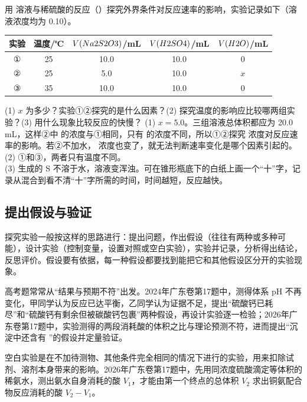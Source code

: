 \begin{liti}[基础·控制变量]
用  溶液与稀硫酸的反应（）探究外界条件对反应速率的影响，实验记录如下（溶液浓度均为 0.10\molL）。

\begin{center}
\small
\begin{tabular}{ccccc}
\toprule
实验 & 温度/℃ & $V(Na2S2O3)$/mL & $V(H2SO4)$/mL & $V(H2O)$/mL \\
\midrule
① & 25 & 10.0 & 10.0 & 0 \\
② & 25 & 5.0 & 10.0 & $x$ \\
③ & 35 & 10.0 & 10.0 & 0 \\
\bottomrule
\end{tabular}
\end{center}
(1) $x$ 为多少？实验①②探究的是什么因素？(2) 探究温度的影响应比较哪两组实验？(3) 用什么现象比较反应的快慢？
\tcblower
\jie (1) $x=5.0$。三组溶液总体积都应为 20.0 mL，这样②中  的浓度与①相同，只有  的浓度不同，所以①②探究  浓度对反应速率的影响。若②不加水， 浓度也变了，就无法判断速率变化是哪个因素引起的。\\
(2) ①和③，两者只有温度不同。\\
(3) 生成的 S 不溶于水，溶液变浑浊。可在锥形瓶底下的白纸上画一个“十”字，记录从混合到看不清“十”字所需的时间，时间越短，反应越快。
\end{liti}

\subsection{提出假设与验证}

探究实验一般按这样的思路进行：提出问题，作出假设（往往有两种或多种可能），设计实验（控制变量，设置对照或空白实验），实验并记录，分析得出结论，反思评价。假设要有依据，每一种假设都要找到能把它和其他假设区分开的实验现象。

高考题常常从“结果与预期不符”出发。2024年广东卷第17题中，测得体系 pH 不再变化，甲同学认为反应已达平衡，乙同学认为证据不足，提出“硫酸钙已耗尽”和“硫酸钙有剩余但被碳酸钙包裹”两种假设，再设计实验逐一检验；2026年广东卷第17题中，实验测得的两段消耗酸的体积之比与理论预测不符，进而提出“沉淀中还含有 ”的假设并定量验证。

空白实验是在不加待测物、其他条件完全相同的情况下进行的实验，用来扣除试剂、溶剂本身带来的影响。2026年广东卷第17题中，先用同浓度硫酸滴定等体积的稀氨水，测出氨水自身消耗的酸 $V_1$，才能由第一个终点的总体积 $V_2$ 求出铜氨配合物反应消耗的酸 $V_2-V_1$。

